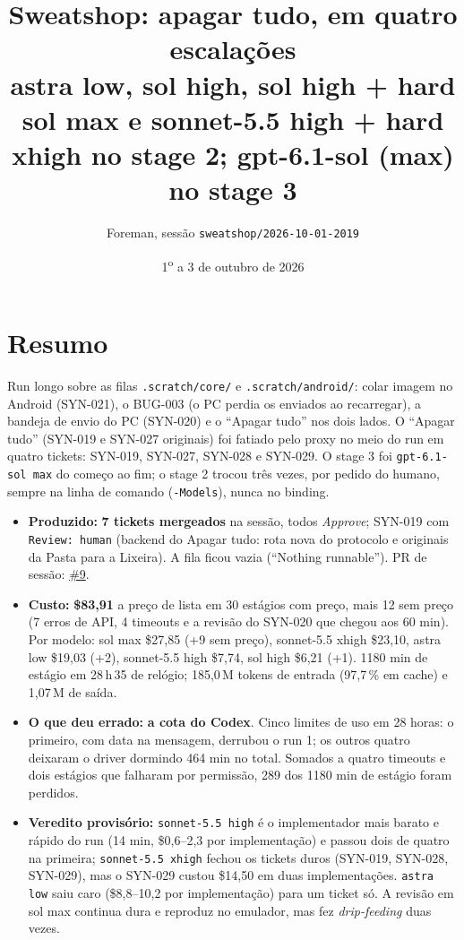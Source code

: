 \documentclass[11pt,a4paper]{article}
\title{Sweatshop: apagar tudo, em quatro escalações\\\large astra low, sol high, sol high + hard sol max e sonnet-5.5 high + hard xhigh no stage 2; gpt-6.1-sol (max) no stage 3}
\author{Foreman, sessão \texttt{sweatshop/2026-10-01-2019}}
\date{1\textsuperscript{o} a 3 de outubro de 2026}
\begin{document}
\maketitle

\section*{Resumo}

Run longo sobre as filas \texttt{.scratch/core/} e \texttt{.scratch/android/}:
colar imagem no Android (SYN-021), o BUG-003 (o PC perdia os enviados ao
recarregar), a bandeja de envio do PC (SYN-020) e o ``Apagar tudo'' nos dois
lados. O ``Apagar tudo'' (SYN-019 e SYN-027 originais) foi fatiado pelo proxy
no meio do run em quatro tickets: SYN-019, SYN-027, SYN-028 e SYN-029. O
stage 3 foi \texttt{gpt-6.1-sol max} do começo ao fim; o stage 2 trocou
três vezes, por pedido do humano, sempre na linha de comando
(\texttt{-Models}), nunca no binding.

\begin{itemize}
  \item \textbf{Produzido:} \textbf{7 tickets mergeados} na sessão, todos
        \emph{Approve}; SYN-019 com \texttt{Review: human} (backend do Apagar
        tudo: rota nova do protocolo e originais da Pasta para a Lixeira). A
        fila ficou vazia (``Nothing runnable''). PR de sessão:
        \href{https://github.com/Laginho/SynchroNice/pull/9}{\#9}.
  \item \textbf{Custo:} \textbf{\$83,91} a preço de lista em 30 estágios com
        preço, mais 12 sem preço (7 erros de API, 4 timeouts e a revisão do
        SYN-020 que chegou aos 60 min). Por modelo: sol max \$27,85 (+9 sem
        preço), sonnet-5.5 xhigh \$23,10, astra low \$19,03 (+2), sonnet-5.5
        high \$7,74, sol high \$6,21 (+1). 1180 min de estágio em 28\,h\,35
        de relógio; 185,0\,M tokens de entrada (97,7\,\% em cache) e 1,07\,M
        de saída.
  \item \textbf{O que deu errado:} \textbf{a cota do Codex}. Cinco limites de
        uso em 28 horas: o primeiro, com data na mensagem, derrubou o run 1; os
        outros quatro deixaram o driver dormindo 464 min no total. Somados a
        quatro timeouts e dois estágios que falharam por permissão, 289 dos
        1180 min de estágio foram perdidos.
  \item \textbf{Veredito provisório:} \texttt{sonnet-5.5 high} é o
        implementador mais barato e rápido do run (14 min, \$0,6--2,3 por
        implementação) e passou dois de quatro na primeira; \texttt{sonnet-5.5
        xhigh} fechou os tickets duros (SYN-019, SYN-028, SYN-029), mas o
        SYN-029 custou \$14,50 em duas implementações. \texttt{astra low} saiu
        caro (\$8,8--10,2 por implementação) para um ticket só. A revisão em
        sol max continua dura e reproduz no emulador, mas fez
        \emph{drip-feeding} duas vezes.
\end{itemize}
\end{document}

